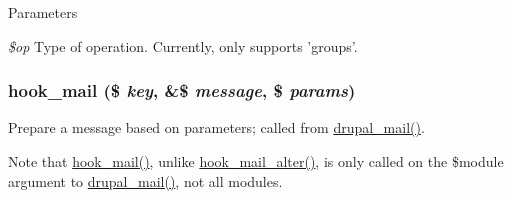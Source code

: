 \begin{DoxyParams}{Parameters}
\item[{\em \$op}]Type of operation. Currently, only supports 'groups'. \end{DoxyParams}
\hypertarget{group__hooks_gacdeb1cba0d0a86ac4de3fff7d4765777}{
\subsubsection[{hook\_\-mail}]{\setlength{\rightskip}{0pt plus 5cm}hook\_\-mail (\$ {\em key}, \/  \&\$ {\em message}, \/  \$ {\em params})}}
\label{group__hooks_gacdeb1cba0d0a86ac4de3fff7d4765777}
Prepare a message based on parameters; called from \hyperlink{mail_8inc_ab80781fd7273975a77cbbd13300eddbf}{drupal\_\-mail()}.

Note that \hyperlink{group__hooks_gacdeb1cba0d0a86ac4de3fff7d4765777}{hook\_\-mail()}, unlike \hyperlink{group__hooks_gaad1d55a8e7b359933f462a9ca5b2ede0}{hook\_\-mail\_\-alter()}, is only called on the \$module argument to \hyperlink{mail_8inc_ab80781fd7273975a77cbbd13300eddbf}{drupal\_\-mail()}, not all modules.


